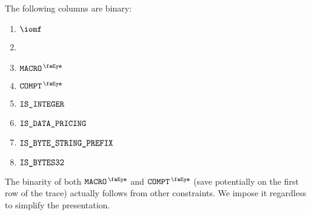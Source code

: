 The following columns are binary:
\begin{multicols}{4}
	\begin{enumerate}
		\item $\iomf$
		\item[\vspace{\fill}]
		\item $\isRlpUtilsMacro$
		\item $\isRlpUtilsCompt$
		\item $\texttt{IS\_INTEGER}$
		\item $\texttt{IS\_DATA\_PRICING}$
		\item $\texttt{IS\_BYTE\_STRING\_PREFIX}$
		\item $\texttt{IS\_BYTES32}$
	\end{enumerate}
\end{multicols}
\saNote{}
The binarity of both
$\isRlpUtilsMacro$ and
$\isRlpUtilsCompt$
(save potentially on the first row of the trace)
actually follows from other constraints.
We impose it regardless to simplify the presentation.

